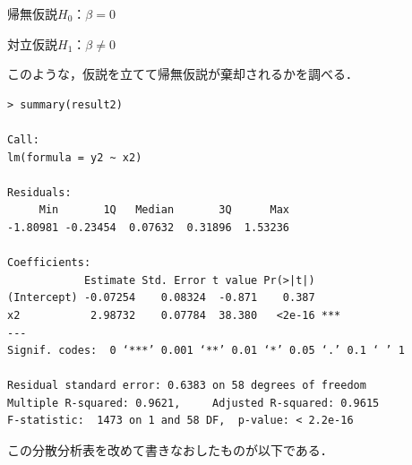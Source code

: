 {\large 帰無仮説$H_0$：$\beta=0$

対立仮説$H_1$：$\beta \ne 0$}

このような，仮説を立てて帰無仮説が棄却されるかを調べる．
\begin{breakbox}
\begin{verbatim}
> summary(result2)

Call:
lm(formula = y2 ~ x2)

Residuals:
     Min       1Q   Median       3Q      Max 
-1.80981 -0.23454  0.07632  0.31896  1.53236 

Coefficients:
            Estimate Std. Error t value Pr(>|t|)    
(Intercept) -0.07254    0.08324  -0.871    0.387    
x2           2.98732    0.07784  38.380   <2e-16 ***
---
Signif. codes:  0 ‘***’ 0.001 ‘**’ 0.01 ‘*’ 0.05 ‘.’ 0.1 ‘ ’ 1 

Residual standard error: 0.6383 on 58 degrees of freedom
Multiple R-squared: 0.9621,     Adjusted R-squared: 0.9615 
F-statistic:  1473 on 1 and 58 DF,  p-value: < 2.2e-16 
\end{verbatim}
\end{breakbox}
この分散分析表を改めて書きなおしたものが以下である．
